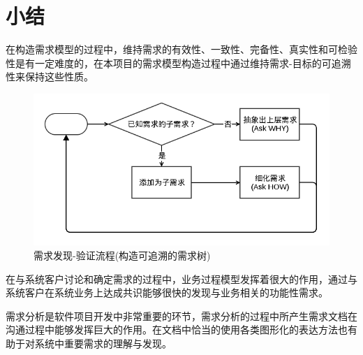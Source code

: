 \section{小结}

在构造需求模型的过程中，维持需求的有效性、一致性、完备性、真实性和可检验性是有一定难度的，在本项目的需求模型构造过程中通过维持需求-目标的可追溯性来保持这些性质。

\begin{figure}[!hbp]
  \begin{center}
    \includegraphics[scale=0.5]{figures/diagram-requirement-workflow.png}
    \caption{需求发现-验证流程(构造可追溯的需求树)\label{RequirementExtraction}}
  \end{center}
\end{figure}

在与系统客户讨论和确定需求的过程中，业务过程模型发挥着很大的作用，通过与系统客户在系统业务上达成共识能够很快的发现与业务相关的功能性需求。

需求分析是软件项目开发中非常重要的环节，需求分析的过程中所产生需求文档在沟通过程中能够发挥巨大的作用。在文档中恰当的使用各类图形化的表达方法也有助于对系统中重要需求的理解与发现。


